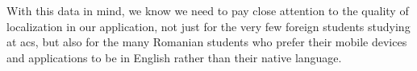 With this data in mind, we know we need to pay close attention to the quality of localization in our application, not just for the very few foreign students studying at \acrshort{acs}, but also for the many Romanian students who prefer their mobile devices and applications to be in English rather than their native language.